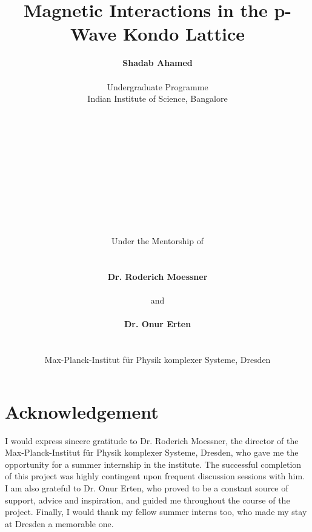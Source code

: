 \documentclass{article}
\title{\textbf{\Huge Magnetic Interactions in the p-Wave Kondo Lattice\vspace{6ex}}}
\author{\textbf{\Large {Shadab Ahamed}} \\\\ \Large Undergraduate Programme\\
\Large Indian Institute of Science, Bangalore\\\\\\\\\\\\\\\\\\\\\\\\ \Large Under the Mentorship of \\\\\\ \Large \textbf{Dr. Roderich Moessner} \\\\ \Large and \\\\ \Large \textbf{Dr. Onur Erten} \\\\\\ \Large Max-Planck-Institut für Physik komplexer Systeme, Dresden }
\date{}
\begin{document}
\maketitle
\thispagestyle{empty}
\newpage
\thispagestyle{empty}
\section*{Acknowledgement}
I would express sincere gratitude to Dr. Roderich Moessner, the director of the Max-Planck-Institut für Physik komplexer Systeme, Dresden, who gave me the opportunity for a summer internship in the institute. The successful completion of this project was highly contingent upon frequent discussion sessions with him. I am also grateful to Dr. Onur Erten, who proved to be a constant source of support, advice and inspiration, and guided me throughout the course of the project. Finally, I would thank my fellow summer interns too, who made my stay at Dresden a memorable one. 
\newpage
\thispagestyle{empty}
\tableofcontents

\newpage
\setcounter{page}{1}
\end{document}
